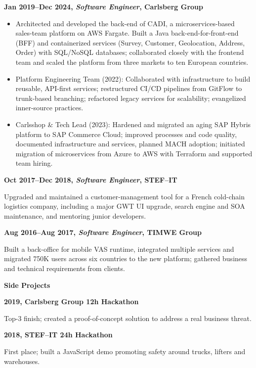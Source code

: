 \documentclass[a4paper,12pt]{memoir}
\newcommand{\Sep}{\vspace{1em}}
\newcommand{\SmallSep}{\vspace{0.5em}}
\newcommand{\CVSection}[1]{{\large\textbf{#1}}\par\SmallSep}
\newcommand{\CVItem}[2]{\textbf{\color{RoyalBlue} #1}\par\small{#2}\SmallSep}
\begin{document}
\CVItem{Jan 2019–Dec 2024, \textit{Software Engineer}, Carlsberg Group}{
\begin{itemize}[leftmargin=*,label={•}]
    \item Architected and developed the back-end of CADI, a microservices-based sales-team platform on AWS Fargate. Built a Java back-end-for-front-end (BFF) and containerized services (Survey, Customer, Geolocation, Address, Order) with SQL/NoSQL databases; collaborated closely with the frontend team and scaled the platform from three markets to ten European countries.
    \item Platform Engineering Team (2022): Collaborated with infrastructure to build reusable, API-first services; restructured CI/CD pipelines from GitFlow to trunk-based branching; refactored legacy services for scalability; evangelized inner-source practices.
    \item Carlsshop \& Tech Lead (2023): Hardened and migrated an aging SAP Hybris platform to SAP Commerce Cloud; improved processes and code quality, documented infrastructure and services, planned MACH adoption; initiated migration of microservices from Azure to AWS with Terraform and supported team hiring.
\end{itemize}
}

\CVItem{Oct 2017–Dec 2018, \textit{Software Engineer}, STEF–IT}{
Upgraded and maintained a customer-management tool for a French cold-chain logistics company, including a major GWT UI upgrade, search engine and SOA maintenance, and mentoring junior developers.
}

\CVItem{Aug 2016–Aug 2017, \textit{Software Engineer}, TIMWE Group}{
Built a back-office for mobile VAS runtime, integrated multiple services and migrated 750K users across six countries to the new platform; gathered business and technical requirements from clients.
}
\Sep

\CVSection{Side Projects}
\CVItem{2019, Carlsberg Group 12h Hackathon}{Top-3 finish; created a proof-of-concept solution to address a real business threat.}

\CVItem{2018, STEF–IT 24h Hackathon}{First place; built a JavaScript demo promoting safety around trucks, lifters and warehouses.}
\end{document}
